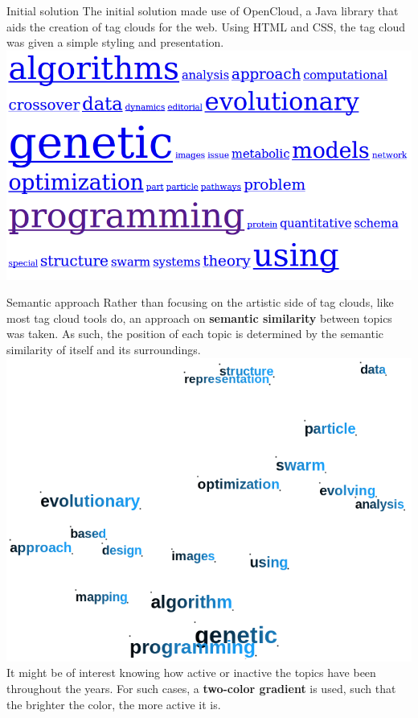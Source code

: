 \documentclass[a0paper, portrait]{baposter}
\begin{document}
\begin{poster}
  \begin{posterbox}[name=initial, column=0, below=tech]{Initial solution} {
    The initial solution made use of OpenCloud, a Java library that aids the creation of tag clouds for the web. Using HTML and CSS, the tag cloud was given a simple styling and presentation. \\
    
    \includegraphics[width=\linewidth]{initial.png}
    \label{fig:2}
  }
  \end{posterbox}

  \begin{posterbox}[name=semantic, column=1, row=0]{Semantic approach} {
    Rather than focusing on the artistic side of tag clouds, like most tag cloud tools do, an approach on {\bf semantic similarity} between topics was taken. As such, the position of each topic is determined by the semantic similarity of itself and its surroundings.\\[3ex]
    \includegraphics[width=\linewidth]{colors2.png}
    \label{fig:3}     
    \vspace{1.0em}It might be of interest knowing how active or inactive the topics have been throughout the years. For such cases, a {\bf two-color gradient} is used, such that the brighter the color, the more active it is. 
  }
  \end{posterbox}
  

\end{poster}
\end{document}
